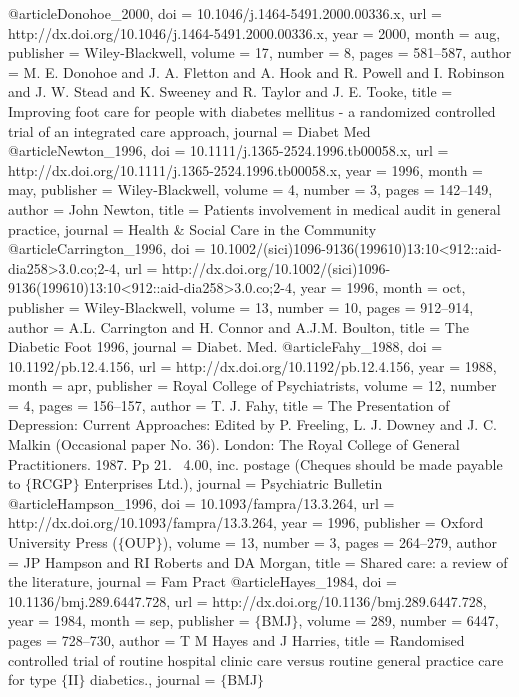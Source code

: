 @article{Donohoe_2000,
	doi = {10.1046/j.1464-5491.2000.00336.x},
	url = {http://dx.doi.org/10.1046/j.1464-5491.2000.00336.x},
	year = 2000,
	month = {aug},
	publisher = {Wiley-Blackwell},
	volume = {17},
	number = {8},
	pages = {581--587},
	author = {M. E. Donohoe and J. A. Fletton and A. Hook and R. Powell and I. Robinson and J. W. Stead and K. Sweeney and R. Taylor and J. E. Tooke},
	title = {Improving foot care for people with diabetes mellitus - a randomized controlled trial of an integrated care approach},
	journal = {Diabet Med}
}
@article{Newton_1996,
	doi = {10.1111/j.1365-2524.1996.tb00058.x},
	url = {http://dx.doi.org/10.1111/j.1365-2524.1996.tb00058.x},
	year = 1996,
	month = {may},
	publisher = {Wiley-Blackwell},
	volume = {4},
	number = {3},
	pages = {142--149},
	author = {John Newton},
	title = {Patients{\textquotesingle} involvement in medical audit in general practice},
	journal = {Health {\&} Social Care in the Community}
}
@article{Carrington_1996,
	doi = {10.1002/(sici)1096-9136(199610)13:10<912::aid-dia258>3.0.co;2-4},
	url = {http://dx.doi.org/10.1002/(sici)1096-9136(199610)13:10<912::aid-dia258>3.0.co;2-4},
	year = 1996,
	month = {oct},
	publisher = {Wiley-Blackwell},
	volume = {13},
	number = {10},
	pages = {912--914},
	author = {A.L. Carrington and H. Connor and A.J.M. Boulton},
	title = {The Diabetic Foot 1996},
	journal = {Diabet. Med.}
}
@article{Fahy_1988,
	doi = {10.1192/pb.12.4.156},
	url = {http://dx.doi.org/10.1192/pb.12.4.156},
	year = 1988,
	month = {apr},
	publisher = {Royal College of Psychiatrists},
	volume = {12},
	number = {4},
	pages = {156--157},
	author = {T. J. Fahy},
	title = {The Presentation of Depression: Current Approaches: Edited by P. Freeling, L. J. Downey and J. C. Malkin (Occasional paper No. 36). London: The Royal College of General Practitioners. 1987. Pp 21. ~4.00, inc. postage (Cheques should be made payable to $\lbrace$RCGP$\rbrace$ Enterprises Ltd.)},
	journal = {Psychiatric Bulletin}
}
@article{Hampson_1996,
	doi = {10.1093/fampra/13.3.264},
	url = {http://dx.doi.org/10.1093/fampra/13.3.264},
	year = 1996,
	publisher = {Oxford University Press ($\lbrace$OUP$\rbrace$)},
	volume = {13},
	number = {3},
	pages = {264--279},
	author = {JP Hampson and RI Roberts and DA Morgan},
	title = {Shared care: a review of the literature},
	journal = {Fam Pract}
}
@article{Hayes_1984,
	doi = {10.1136/bmj.289.6447.728},
	url = {http://dx.doi.org/10.1136/bmj.289.6447.728},
	year = 1984,
	month = {sep},
	publisher = {$\lbrace$BMJ$\rbrace$},
	volume = {289},
	number = {6447},
	pages = {728--730},
	author = {T M Hayes and J Harries},
	title = {Randomised controlled trial of routine hospital clinic care versus routine general practice care for type $\lbrace$II$\rbrace$ diabetics.},
	journal = {$\lbrace$BMJ$\rbrace$}
}
